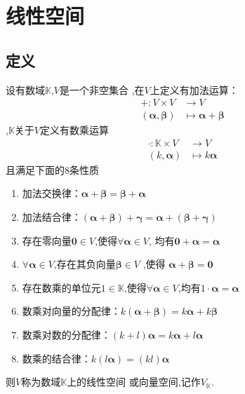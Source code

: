 \section{线性空间}
\subsection{定义}
\begin{formal}
\begin{definition}[线性空间]\label{def:线性空间}
    设有数域$\mathbb{K}$,$V$是一个非空集合
    ,在$V$上定义有加法运算：
    \begin{align*}
        + :
        V \times V & \longrightarrow V\\
        \left(\bm{\alpha},\bm{\beta}
        \right) &\longmapsto \bm{\alpha}+
        \bm{\beta}
    \end{align*}
    ,$\mathbb{K}$关于$V$定义有数乘运算
    \begin{align*}
        \cdot :
        \mathbb{K} \times V 
        &
        \longrightarrow V \\
        \left(k,\bm{\alpha}\right)
        &\longmapsto k\bm{\alpha}
    \end{align*}
    且满足下面的$8$条性质
    \begin{enumerate}[label=\textup{(\arabic*)}]
        \item 加法交换律：$\bm{\alpha}+\bm{\beta}
        =\bm{\beta}+\bm{\alpha}
        $
        \item 加法结合律：$
        \left(\bm{\alpha}+
        \bm{\beta}\right)+\bm{\gamma}
        = \bm{\alpha}+
        \left(\bm{\beta}+\bm{\gamma}\right)
    $
        \item 存在零向量$\bm{0}
        \in V$,使得$
        \forall \bm{\alpha} \in V$,
        均有$\bm{0}+\bm{\alpha}
        =\bm{\alpha}$
        \item $\forall \bm{\alpha}\in V
        $,存在其负向量$\bm{\beta}\in V$
            ,使得
        $\bm{\alpha} + \bm{\beta} = \bm{0}
        $
        \item 存在数乘的单位元$1\in\mathbb{K}
        $,使得$\forall\bm{\alpha}\in V
        $,均有$1\cdot\bm{\alpha} = 
        \bm{\alpha}$
        \item 数乘对向量的分配律：$k
        \left(\bm{\alpha}+\bm{\beta}\right)=
        k\bm{\alpha}+k\bm{\beta}
        $
        \item 数乘对数的分配律：$
        \left(k+l\right)\bm{\alpha}=
        k\bm{\alpha}+l\bm{\alpha}
        $
        \item 数乘的结合律：$
        k\left(l\bm{\alpha}\right)
        =
        \left(kl\right)\bm{\alpha}
        $
    \end{enumerate}
    则$V$称为数域$\mathbb{K}$上的线性空间
    或向量空间,记作$V_{\mathbb{K}}$.
\end{definition}
\end{formal}
